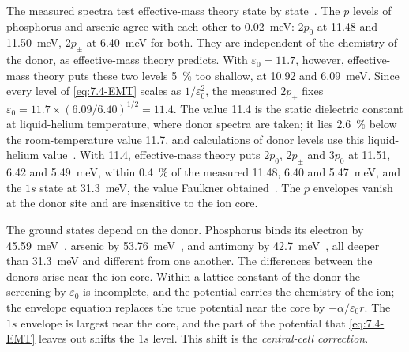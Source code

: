 The measured spectra test effective-mass theory state by state~\cite[Fig.~1]{vinh2008silicon}. The $p$ levels of phosphorus and arsenic agree with each other to \SI{0.02}{meV}: $2p_0$ at 11.48 and \SI{11.50}{meV}, $2p_\pm$ at \SI{6.40}{meV} for both. They are independent of the chemistry of the donor, as effective-mass theory predicts. With $\varepsilon_0 = 11.7$, however, effective-mass theory puts these two levels \SI{5}{\percent} too shallow, at 10.92 and \SI{6.09}{meV}. Since every level of \cref{eq:7.4-EMT} scales as $1/\varepsilon_0^2$, the measured $2p_\pm$ fixes $\varepsilon_0 = 11.7\times(6.09/6.40)^{1/2} = 11.4$. The value 11.4 is the static dielectric constant at liquid-helium temperature, where donor spectra are taken; it lies \SI{2.6}{\percent} below the room-temperature value 11.7, and calculations of donor levels use this liquid-helium value~\cite{faulkner1969higher,smith2017ab}. With 11.4, effective-mass theory puts $2p_0$, $2p_\pm$ and $3p_0$ at 11.51, 6.42 and \SI{5.49}{meV}, within \SI{0.4}{\percent} of the measured 11.48, 6.40 and \SI{5.47}{meV}, and the $1s$ state at \SI{31.3}{meV}, the value Faulkner obtained~\cite{faulkner1969higher,smith2017ab}. The $p$ envelopes vanish at the donor site and are insensitive to the ion core.

The ground states depend on the donor. Phosphorus binds its electron by \SI{45.59}{meV}~\cite{jagannath1981linewidths}, arsenic by \SI{53.76}{meV}~\cite[Fig.~1]{vinh2008silicon}, and antimony by \SI{42.7}{meV}~\cite[Table~3]{claes2025accurate}, all deeper than \SI{31.3}{meV} and different from one another. The differences between the donors arise near the ion core. Within a lattice constant of the donor the screening by $\varepsilon_0$ is incomplete, and the potential carries the chemistry of the ion; the envelope equation replaces the true potential near the core by $-\alpha/\varepsilon_0 r$. The $1s$ envelope is largest near the core, and the part of the potential that \cref{eq:7.4-EMT} leaves out shifts the $1s$ level. This shift is the \emph{central-cell correction}.

